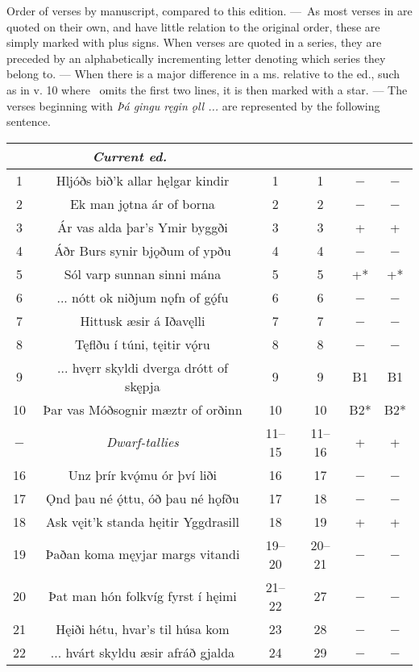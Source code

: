 {Order of verses by manuscript, compared to this edition. — As most verses in \GylfMS are quoted on their own, and have little relation to the original order, these are simply marked with plus signs. When verses are quoted in a series, they are preceded by an alphabetically incrementing letter denoting which series they belong to. — When there is a major difference in a ms. relative to the ed., such as in v. 10 where \GylfMS\ omits the first two lines, it is then marked with a star. — The verses beginning with \emph{Þá gingu ręgin ǫll ...} are represented by the following sentence.
\begin{longtable}{|c c c c c c|} 
	\hline
	\multicolumn{2}{|c}{\emph{Current ed.}} & \Regius & \Hauksbok & \RegiusProse\Trajectinus\Wormianus & \Upsaliensis \\ [0.5ex]
	\hline\hline
	1 & Hljóðs bið’k allar hęlgar kindir & 1 & 1 & − & − \\
	2 & Ek man jǫtna ár of borna & 2 & 2 & − & − \\
	3 & Ár vas alda þar’s Ymir byggði & 3 & 3 & + & + \\
	4 & Áðr Burs synir bjǫðum of ypðu & 4 & 4 & − & − \\
	5 & Sól varp sunnan sinni mána & 5 & 5 & +* & +* \\
	6 & ... nótt ok niðjum nǫfn of gǫ́fu & 6 & 6 & − & − \\
	7 & Hittusk æsir á Iðavęlli & 7 & 7 & − & − \\
	8 & Tęflðu í túni, tęitir vǫ́ru & 8 & 8 & − & − \\
	9 & ... hvęrr skyldi dverga drótt of skępja & 9 & 9 & B1 & B1 \\
	10 & Þar vas Móðsognir mæztr of orðinn & 10 & 10 & B2* & B2* \\
	− & \emph{Dwarf-tallies} & 11–15 & 11–16 & + & + \\
	16 & Unz þrír kvǫ́mu ór því liði & 16 & 17 & − & − \\
	17 & Ǫnd þau né ǫ́ttu, óð þau né hǫfðu & 17 & 18 & − & − \\
	18 & Ask vęit’k standa hęitir Yggdrasill & 18 & 19 & + & + \\
	19 & Þaðan koma męyjar margs vitandi & 19–20 & 20–21 & − & − \\
	20 & Þat man hón folkvíg fyrst í hęimi & 21–22 & 27 & − & − \\
	21 & Hęiði hétu, hvar’s til húsa kom & 23 & 28 & − & − \\
	22 & ... hvárt skyldu æsir afráð gjalda & 24 & 29 & − & − \\

\end{longtable}}

